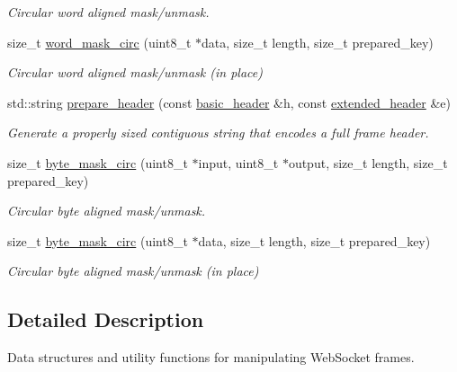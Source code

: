 \begin{DoxyCompactItemize}
\begin{DoxyCompactList}\small\item\em Circular word aligned mask/unmask. \end{DoxyCompactList}\item 
size\+\_\+t \mbox{\hyperlink{namespacewebsocketpp_1_1frame_af1365b296d14ee7dea6e17d0af368821}{word\+\_\+mask\+\_\+circ}} (uint8\+\_\+t $\ast$data, size\+\_\+t length, size\+\_\+t prepared\+\_\+key)
\begin{DoxyCompactList}\small\item\em Circular word aligned mask/unmask (in place) \end{DoxyCompactList}\item 
std\+::string \mbox{\hyperlink{namespacewebsocketpp_1_1frame_ae63c3e01399a6787ed09b710853344a4}{prepare\+\_\+header}} (const \mbox{\hyperlink{structwebsocketpp_1_1frame_1_1basic__header}{basic\+\_\+header}} \&h, const \mbox{\hyperlink{structwebsocketpp_1_1frame_1_1extended__header}{extended\+\_\+header}} \&e)
\begin{DoxyCompactList}\small\item\em Generate a properly sized contiguous string that encodes a full frame header. \end{DoxyCompactList}\item 
size\+\_\+t \mbox{\hyperlink{namespacewebsocketpp_1_1frame_a3e0ba89b475df758d84dab352a76c3b3}{byte\+\_\+mask\+\_\+circ}} (uint8\+\_\+t $\ast$input, uint8\+\_\+t $\ast$output, size\+\_\+t length, size\+\_\+t prepared\+\_\+key)
\begin{DoxyCompactList}\small\item\em Circular byte aligned mask/unmask. \end{DoxyCompactList}\item 
size\+\_\+t \mbox{\hyperlink{namespacewebsocketpp_1_1frame_a5e0b4f532f0d309a605e232cfdb03960}{byte\+\_\+mask\+\_\+circ}} (uint8\+\_\+t $\ast$data, size\+\_\+t length, size\+\_\+t prepared\+\_\+key)
\begin{DoxyCompactList}\small\item\em Circular byte aligned mask/unmask (in place) \end{DoxyCompactList}\end{DoxyCompactItemize}


\subsection{Detailed Description}
Data structures and utility functions for manipulating Web\+Socket frames. 

